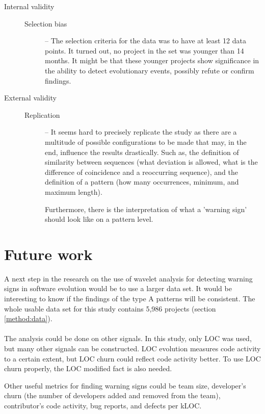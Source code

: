 \begin{description}
	\item[Internal validity] \hfill

	\begin{description}
		\item[\rm{Selection bias}] -- The selection criteria for the data was to have
			at least 12 data points. It turned out, no project in the set was younger
			than 14 months. It might be that these younger projects show significance in
			the ability to detect evolutionary events, possibly refute or confirm
			findings.
	\end{description}

	\item[External validity] \hfill

	\begin{description}
		\item[\rm{Replication}] -- It seems hard to precisely replicate the study
			as there are a multitude of possible configurations to be made that may, in
			the end, influence the results drastically. Such as, the definition of
			similarity between sequences (what deviation is allowed, what is the
			difference of coincidence and a reoccurring sequence), and the definition of
			a pattern (how many occurrences, minimum, and maximum length).
			
			Furthermore, there is the interpretation of what a 'warning sign' should
			look like on a pattern level.
	\end{description}
\end{description}

\section{Future work}
A next step in the research on the use of wavelet analysis for detecting
warning signs in software evolution would be to use a larger data set. It would
be interesting to know if the findings of the type A patterns will be
consistent. The whole usable data set for this study contains 5,986 projects
(section \ref{method:data}).

\paragraph{}
The analysis could be done on other signals. In this study, only LOC was used,
but many other signals can be constructed. LOC evolution measures code activity
to a certain extent, but LOC churn could reflect code activity better. To use
LOC churn properly, the LOC modified fact is also needed.

Other useful metrics for finding warning signs could be team size, developer's
churn (the number of developers added and removed from the team), contributor's
code activity, bug reports, and defects per kLOC.